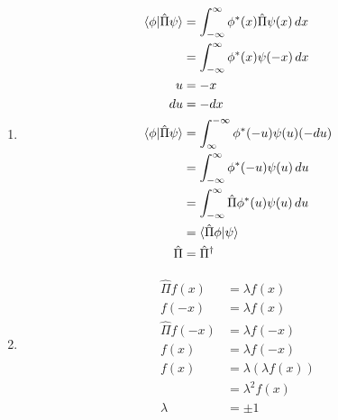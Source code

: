 \documentclass{article}
\begin{document}
\begin{enumerate}
  \item

        \begin{align*}
          \braket{\phi | \hat{\Pi} \psi} & = \int_{-\infty}^\infty \phi^*(x) \hat{\Pi} \psi(x) \,d x \\
                                         & = \int_{-\infty}^\infty \phi^*(x) \psi(-x) \,d x          \\
          u                              & = -x                                                      \\
          d u                            & = -d x                                                    \\
          \braket{\phi | \hat{\Pi} \psi} & = \int_\infty^{-\infty} \phi^*(-u) \psi(u) (-du)          \\
                                         & = \int_{-\infty}^\infty \phi^*(-u) \psi(u) \,d u          \\
                                         & = \int_{-\infty}^\infty \hat{\Pi} \phi^*(u) \psi(u) \,d u \\
                                         & = \braket{\hat{\Pi} \phi | \psi}                          \\
          \hat{\Pi}                      & = \hat{\Pi}^\dagger
        \end{align*}

  \item

        \begin{align*}
          \hat{\Pi} f(x)  & = \lambda f(x)           \\
          f(-x)           & = \lambda f(x)           \\
          \hat{\Pi} f(-x) & = \lambda f(-x)          \\
          f(x)            & = \lambda f(-x)          \\
          f(x)            & = \lambda (\lambda f(x)) \\
                          & = \lambda^2 f(x)         \\
          \lambda         & = \pm 1
        \end{align*}
\end{enumerate}

\subsection{}
\end{document}
